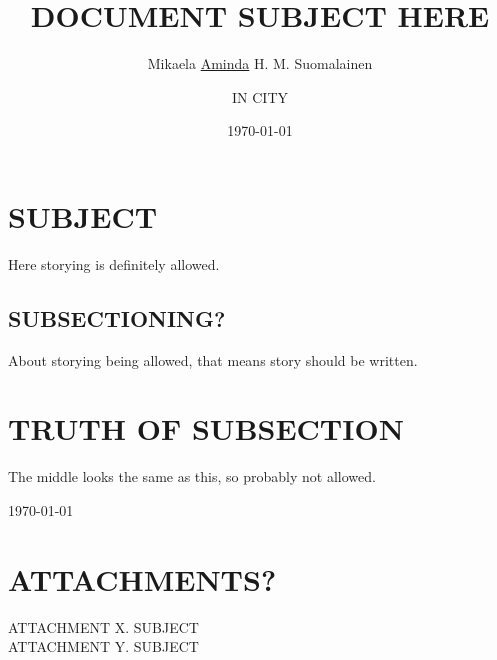 \documentclass[a4paper,10pt]{vakioasiakirja}
\author{Mikaela \underline{Aminda} H. M. Suomalainen}
\date{\today}
\title{DOCUMENT SUBJECT HERE}
\begin{document}
\maketitle

\section*{SUBJECT}

\align Here storying is definitely allowed.

\subsection*{SUBSECTIONING?}

\align About storying being allowed, that means story should be written.

\section*{TRUTH OF SUBSECTION}


\align The middle looks the same as this, so probably not allowed.

\signature{IN CITY}\today

\vfill

\section{ATTACHMENTS?}
\align
ATTACHMENT X. SUBJECT \\
ATTACHMENT Y. SUBJECT

\end{document}

